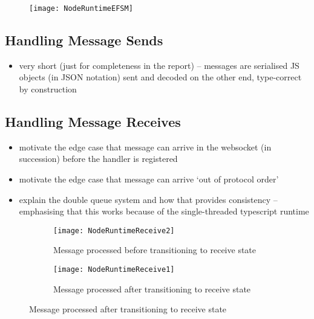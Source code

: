 \begin{figure}[!ht]
\centering
\texttt{[image: NodeRuntimeEFSM]}
\label{fig:noderuntimeefsm}
\end{figure}

\subsection{Handling Message Sends}
\begin{itemize}
\item very short (just for completeness in the report) -- messages are serialised JS objects (in JSON notation) sent and decoded on the other end, type-correct by construction
\end{itemize}

\subsection{Handling Message Receives}
\begin{itemize}
\item motivate the edge case that message can arrive in the websocket (in succession) before the handler is registered
\item motivate the edge case that message can arrive `out of protocol order' 
\item explain the double queue system and how that provides consistency -- emphasising that this works because of the single-threaded typescript runtime
\end{itemize}

\begin{figure}[!ht]
\centering
\begin{subfigure}[b]{0.8\textwidth}
\centering
\texttt{[image: NodeRuntimeReceive2]}
\caption{Message processed before transitioning to receive state}
\label{subfig:nodereceivemsgfirst}
\end{subfigure}
\hfill
\begin{subfigure}[b]{0.8\textwidth}
\centering
\texttt{[image: NodeRuntimeReceive1]}
\caption{Message processed after transitioning to receive state}
\label{subfig:nodereceivehandlefirst}
\end{subfigure}
\label{fig:nodereceivecompare}
\end{figure}


